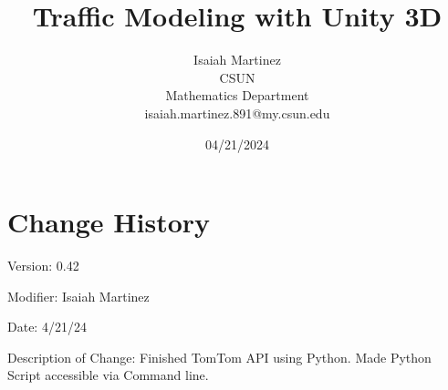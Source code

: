 \documentclass[a4paper,10pt]{article}
\begin{document}
%
    \title{Traffic Modeling with Unity 3D}

    \author{Isaiah Martinez \\ CSUN \\ Mathematics Department \\ isaiah.martinez.891@my.csun.edu}
          
    \date{04/21/2024}

    \maketitle
   
    \tableofcontents
 
    \newpage

    \section{Change History}

    Version: 0.42

    Modifier: Isaiah Martinez
    
    Date: 4/21/24
    
    Description of Change: Finished TomTom API using Python.
    Made Python Script accessible via Command line.
    
    
    

    
\end{document}
